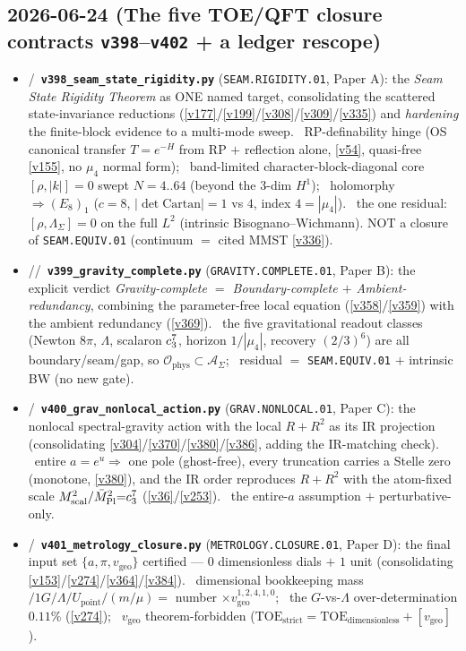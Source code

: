 \subsection*{2026-06-24 (The five TOE/QFT closure contracts \texttt{v398}--\texttt{v402} + a ledger rescope)}
\begin{itemize}
\item \mE/\mO\ \textbf{\texttt{v398\_seam\_state\_rigidity.py}} (\texttt{SEAM.RIGIDITY.01}, Paper A): the \emph{Seam State Rigidity Theorem} as ONE named target, consolidating the scattered state-invariance reductions (\vref{v177}/\vref{v199}/\vref{v308}/\vref{v309}/\vref{v335}) and \emph{hardening} the finite-block evidence to a multi-mode sweep. \mE\ RP-definability hinge (OS canonical transfer $T{=}e^{-H}$ from RP $+$ reflection alone, \vref{v54}, quasi-free \vref{v155}, no $\mu_4$ normal form); \mE\ band-limited character-block-diagonal core $[\rho,|k|]{=}0$ swept $N{=}4..64$ (beyond the $3$-dim $H^1$); \mE\ holomorphy $\Rightarrow(E_8)_1$ ($c{=}8$, $|\!\det\mathrm{Cartan}|{=}1$ vs $4$, index $4{=}|\mu_4|$). \mO\ the one residual: $[\rho,\Lambda_\Sigma]{=}0$ on the full $L^2$ (intrinsic Bisognano--Wichmann). NOT a closure of \texttt{SEAM.EQUIV.01} (continuum $=$ cited MMST \vref{v336}).
\item \mE/\mC/\mO\ \textbf{\texttt{v399\_gravity\_complete.py}} (\texttt{GRAVITY.COMPLETE.01}, Paper B): the explicit verdict \emph{Gravity-complete $=$ Boundary-complete $+$ Ambient-redundancy}, combining the parameter-free local equation (\vref{v358}/\vref{v359}) with the ambient redundancy (\vref{v369}). \mE\ the five gravitational readout classes (Newton $8\pi$, $\Lambda$, scalaron $c_3^7$, horizon $1/|\mu_4|$, recovery $(2/3)^6$) are all boundary/seam/gap, so $\mathcal O_{\mathrm{phys}}\subset\mathcal A_\Sigma$; \mO\ residual $=$ \texttt{SEAM.EQUIV.01} $+$ intrinsic BW (no new gate).
\item \mE/\mO\ \textbf{\texttt{v400\_grav\_nonlocal\_action.py}} (\texttt{GRAV.NONLOCAL.01}, Paper C): the nonlocal spectral-gravity action with the local $R{+}R^2$ as its IR projection (consolidating \vref{v304}/\vref{v370}/\vref{v380}/\vref{v386}, adding the IR-matching check). \mE\ entire $a{=}e^u\Rightarrow$ one pole (ghost-free), every truncation carries a Stelle zero (monotone, \vref{v380}), and the IR order reproduces $R{+}R^2$ with the atom-fixed scale $M_{\mathrm{scal}}^2/\bar M_{\mathrm{Pl}}^2{=}c_3^7$ (\vref{v36}/\vref{v253}). \mO\ the entire-$a$ assumption $+$ perturbative-only.
\item \mE/\mO\ \textbf{\texttt{v401\_metrology\_closure.py}} (\texttt{METROLOGY.CLOSURE.01}, Paper D): the final input set $\{a,\pi,v_{\mathrm{geo}}\}$ certified --- $0$ dimensionless dials $+$ $1$ unit (consolidating \vref{v153}/\vref{v274}/\vref{v364}/\vref{v384}). \mE\ dimensional bookkeeping mass$/1G/\Lambda/U_{\mathrm{point}}/(m/\mu){=}$ number $\times v_{\mathrm{geo}}^{1,2,4,1,0}$; \mE\ the $G$-vs-$\Lambda$ over-determination $0.11\%$ (\vref{v274}); \mO\ $v_{\mathrm{geo}}$ theorem-forbidden ($\mathrm{TOE}_{\mathrm{strict}}{=}\mathrm{TOE}_{\mathrm{dimensionless}}{+}[v_{\mathrm{geo}}]$).

\end{itemize}
